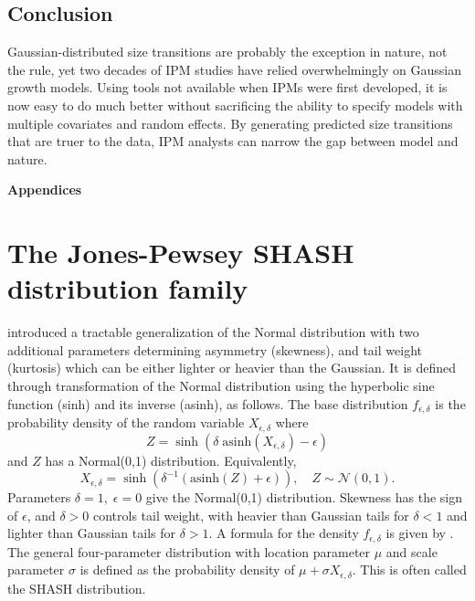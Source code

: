\documentclass[12pt]{article}
\newcounter{box}
\newcommand{\be}{\begin{equation}}
\newcommand{\ee}{\end{equation}}
\begin{document}
 \subsection*{Conclusion}
Gaussian-distributed size transitions are probably the exception in nature, not the rule, yet two decades of IPM studies have relied overwhelmingly on Gaussian growth models. 
Using tools not available when IPMs were first developed, it is now easy to do much better without sacrificing the ability to specify models with multiple covariates and random effects.  
By generating predicted size transitions that are truer to the data, IPM analysts can narrow the gap between model and nature. 

\newpage 



\newpage 
\clearpage 
\setcounter{equation}{0}
\setcounter{figure}{0}
\setcounter{section}{0}
\setcounter{table}{0}
\setcounter{Box}{0}
\renewcommand{\theequation}{S.\arabic{equation}}
\renewcommand{\thetable}{S-\arabic{table}}
\renewcommand{\thefigure}{S-\arabic{figure}}
\renewcommand{\theBox}{S-\arabic{Box}}
\renewcommand{\thesection}{S.\arabic{section}}

\centerline{\Large{\textbf{Appendices}}}

\section{The Jones-Pewsey SHASH distribution family} 
\label{sec:SHASHdist} 
\citet{jones-pewsey-2009} introduced a tractable generalization of the Normal distribution with two additional parameters determining  
asymmetry (skewness), and tail weight (kurtosis) which can be either lighter or heavier than the Gaussian. It is defined through transformation of the
Normal distribution using the hyperbolic sine function (sinh) and its inverse (asinh), as follows. The base distribution $f_{\epsilon,\delta}$  is the 
probability density of the random variable $X_{\epsilon,\delta}$ where  
\be
Z = \sinh (\delta \; \mbox{asinh}(X_{\epsilon,\delta}) - \epsilon)
\label{eqn:JP1}
\ee
and $Z$ has a Normal(0,1) distribution. Equivalently, 
\be
X_{\epsilon,\delta} = \sinh \left( \delta^{-1} (\mbox{asinh}(Z) + \epsilon)\right), \quad Z \sim \mathcal{N}(0,1).
\label{eqn:JP2}
\ee
Parameters $\delta=1, \; \epsilon=0$ give the Normal(0,1) distribution. Skewness has the sign of $\epsilon$, and
$\delta > 0$ controls tail weight, with heavier than Gaussian tails for $\delta<1$ and lighter than Gaussian tails for $\delta > 1$. 
A formula for the density $f_{\epsilon,\delta}$ is given by \citet[][eqn. 2]{jones-pewsey-2009}. 
The general four-parameter distribution with location parameter $\mu$ and scale parameter $\sigma$ is defined as the probability density 
of $\mu + \sigma X_{\epsilon, \delta}$. This is often called the SHASH distribution. 
\end{document}
